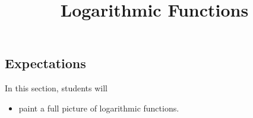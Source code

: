 \documentclass{ximera}
\title{Logarithmic Functions}
\begin{document}
\begin{abstract}
\end{abstract}
\maketitle



















\subsection{Expectations}


\begin{sectionOutcomes}
In this section, students will 

\begin{itemize}
\item paint a full picture of logarithmic functions.
\end{itemize}
\end{sectionOutcomes}
\end{document}
